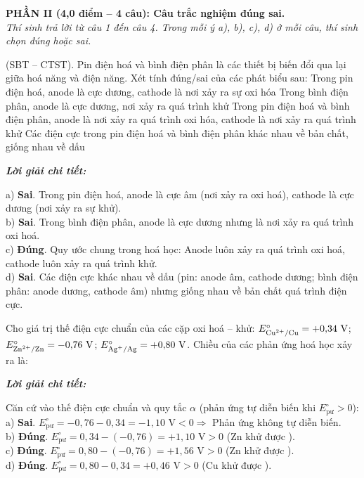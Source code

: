 \documentclass[11pt,a4paper]{article}
\def\loigiai#1{
\par\begingroup\color{blue!80!black}\small
\noindent\textbf{\textit{Lời giải chi tiết:}}\par
#1\par\endgroup}
\begin{document}
\noindent
\textbf{PHẦN II (4,0 điểm -- 4 câu): Câu trắc nghiệm đúng sai.}\\
\textit{Thí sinh trả lời từ câu 1 đến câu 4. Trong mỗi ý a), b), c), d) ở mỗi câu, thí sinh chọn đúng hoặc sai.}

\setcounter{ex}{0}

\begin{ex}
(SBT – CTST). Pin điện hoá và bình điện phân là các thiết bị biến đổi qua lại giữa hoá năng và điện năng. Xét tính đúng/sai của các phát biểu sau:
\choiceTF
{Trong pin điện hoá, anode là cực dương, cathode là nơi xảy ra sự oxi hóa}
{Trong bình điện phân, anode là cực dương, nơi xảy ra quá trình khử}
{\True Trong pin điện hoá và bình điện phân, anode là nơi xảy ra quá trình oxi hóa, cathode là nơi xảy ra quá trình khử}
{Các điện cực trong pin điện hoá và bình điện phân khác nhau về bản chất, giống nhau về dấu}
\loigiai{
a) \textbf{Sai}. Trong pin điện hoá, anode là cực âm (nơi xảy ra oxi hoá), cathode là cực dương (nơi xảy ra sự khử).\\
b) \textbf{Sai}. Trong bình điện phân, anode là cực dương nhưng là nơi xảy ra quá trình oxi hoá.\\
c) \textbf{Đúng}. Quy ước chung trong hoá học: Anode luôn xảy ra quá trình oxi hoá, cathode luôn xảy ra quá trình khử.\\
d) \textbf{Sai}. Các điện cực khác nhau về dấu (pin: anode âm, cathode dương; bình điện phân: anode dương, cathode âm) nhưng giống nhau về bản chất quá trình điện cực.}
\end{ex}

\begin{ex}
Cho giá trị thế điện cực chuẩn của các cặp oxi hoá – khử: $E^\circ_{\ce{Cu^2+/Cu}} = +0{,}34\text{ V}$; $E^\circ_{\ce{Zn^2+/Zn}} = -0{,}76\text{ V}$; $E^\circ_{\ce{Ag+/Ag}} = +0{,}80\text{ V}$. Chiều của các phản ứng hoá học xảy ra là:
\choiceTF
{}
{\True {}}
{\True {}}
{\True {}}
\loigiai{
Căn cứ vào thế điện cực chuẩn và quy tắc $\alpha$ (phản ứng tự diễn biến khi $E^\circ_{\text{pư}} > 0$):\\
a) \textbf{Sai}. $E^\circ_{\text{pư}} = -0{,}76 - 0{,}34 = -1{,}10\text{ V} < 0 \Rightarrow$ Phản ứng không tự diễn biến.\\
b) \textbf{Đúng}. $E^\circ_{\text{pư}} = 0{,}34 - (-0{,}76) = +1{,}10\text{ V} > 0$ (Zn khử được \ce{Cu^2+}).\\
c) \textbf{Đúng}. $E^\circ_{\text{pư}} = 0{,}80 - (-0{,}76) = +1{,}56\text{ V} > 0$ (Zn khử được \ce{Ag+}).\\
d) \textbf{Đúng}. $E^\circ_{\text{pư}} = 0{,}80 - 0{,}34 = +0{,}46\text{ V} > 0$ (Cu khử được \ce{Ag+}).}
\end{ex}
\end{document}

